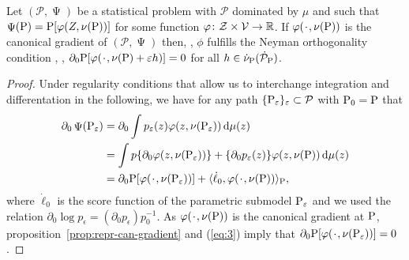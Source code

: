 \documentclass[a4,danish]{article}
\DeclareMathOperator{\TT}{\Psi}
\begin{document}
\begin{proposition}
  Let $(\mathcal{P}, \TT)$ be a statistical problem with $\mathcal{P}$ dominated by $\mu$ and such
  that $\TT(\P) = \P[\phi(Z, \nu(\P))]$ for some function
  $\phi\colon \mathcal{Z} \times \mathcal{V} \rightarrow \R$. If $\phi(\blank, \nu(\P))$ is the
  canonical gradient of $(\mathcal{P}, \TT)$ then, , $\phi$ fulfills the Neyman orthogonality condition ,
  ,
  $\partial_0 \P[\phi(\blank, \nu(\P) + \epsilon h)] = 0$ for all
  $h \in \dot{\nu}_{\P}(\dot{\mathcal{P}}_{\P})$.
\end{proposition}

\begin{proof}
  Under regularity conditions that allow us to interchange integration and differentation in the
  following, we have for any  path
  $\{\P_{\epsilon}\}_{\epsilon} \subset \mathcal{P}$ with $\P_0=\P$ that
  \begin{align}
    \label{eq:3}
    \begin{split}
      \partial_0 \TT(\P_{\epsilon})%
      & =\partial_0 \int p_{\epsilon}(z) \phi(z, \nu(\P_{\epsilon})) \diff \mu(z) \\
      & = \int p \{\partial_0  \phi(z, \nu(\P_{\epsilon}))\} +  \{\partial_0 p_{\epsilon}(z)\} \phi(z, \nu(\P)) \diff \mu(z) \\
      & = \partial_0 \P[ \phi(\blank, \nu(\P_{\epsilon}))] +
      \langle \dot{\ell}_0, \phi(\blank, \nu(\P))\rangle_{\P},
    \end{split}
  \end{align}
  where $\dot{\ell}_0$ is the score function of the parametric submodel $\P_{\epsilon}$ and we used
  the relation $\partial_{0}\log p_{\epsilon} = (\partial_{0} p_{\epsilon})p_0^{-1}$. As
  $\phi(\blank, \nu(\P))$ is the canonical gradient at $\P$,
  proposition~\ref{prop:repr-can-gradient} and (\ref{eq:3}) imply that
  $\partial_0 \P[ \phi(\blank, \nu(\P_{\epsilon}))]=0$. 
\end{proof}
\end{document}
